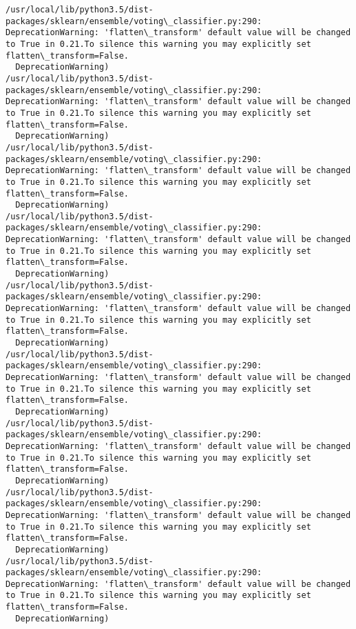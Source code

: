 \documentclass[11pt]{article}
\begin{document}
    \begin{Verbatim}[commandchars=\\\{\}]
/usr/local/lib/python3.5/dist-packages/sklearn/ensemble/voting\_classifier.py:290: DeprecationWarning: 'flatten\_transform' default value will be changed to True in 0.21.To silence this warning you may explicitly set flatten\_transform=False.
  DeprecationWarning)
/usr/local/lib/python3.5/dist-packages/sklearn/ensemble/voting\_classifier.py:290: DeprecationWarning: 'flatten\_transform' default value will be changed to True in 0.21.To silence this warning you may explicitly set flatten\_transform=False.
  DeprecationWarning)
/usr/local/lib/python3.5/dist-packages/sklearn/ensemble/voting\_classifier.py:290: DeprecationWarning: 'flatten\_transform' default value will be changed to True in 0.21.To silence this warning you may explicitly set flatten\_transform=False.
  DeprecationWarning)
/usr/local/lib/python3.5/dist-packages/sklearn/ensemble/voting\_classifier.py:290: DeprecationWarning: 'flatten\_transform' default value will be changed to True in 0.21.To silence this warning you may explicitly set flatten\_transform=False.
  DeprecationWarning)
/usr/local/lib/python3.5/dist-packages/sklearn/ensemble/voting\_classifier.py:290: DeprecationWarning: 'flatten\_transform' default value will be changed to True in 0.21.To silence this warning you may explicitly set flatten\_transform=False.
  DeprecationWarning)
/usr/local/lib/python3.5/dist-packages/sklearn/ensemble/voting\_classifier.py:290: DeprecationWarning: 'flatten\_transform' default value will be changed to True in 0.21.To silence this warning you may explicitly set flatten\_transform=False.
  DeprecationWarning)
/usr/local/lib/python3.5/dist-packages/sklearn/ensemble/voting\_classifier.py:290: DeprecationWarning: 'flatten\_transform' default value will be changed to True in 0.21.To silence this warning you may explicitly set flatten\_transform=False.
  DeprecationWarning)
/usr/local/lib/python3.5/dist-packages/sklearn/ensemble/voting\_classifier.py:290: DeprecationWarning: 'flatten\_transform' default value will be changed to True in 0.21.To silence this warning you may explicitly set flatten\_transform=False.
  DeprecationWarning)
/usr/local/lib/python3.5/dist-packages/sklearn/ensemble/voting\_classifier.py:290: DeprecationWarning: 'flatten\_transform' default value will be changed to True in 0.21.To silence this warning you may explicitly set flatten\_transform=False.
  DeprecationWarning)

    \end{Verbatim}
\end{document}
